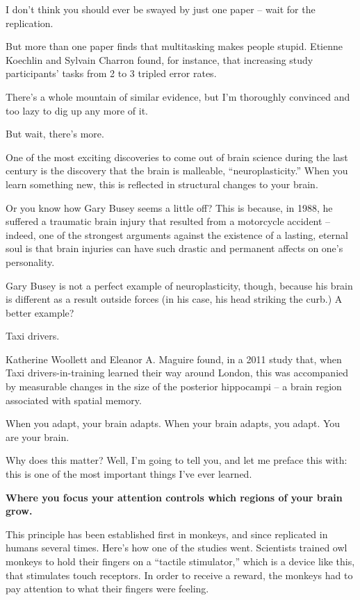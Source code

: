 I don't think you should ever be swayed by just one paper -- wait for the
replication.

But more than one paper finds that multitasking makes people stupid. Etienne
Koechlin and Sylvain Charron found, for instance, that increasing study
participants' tasks from 2 to 3 tripled error rates. \cite{charron2010divided}

There's a whole mountain of similar evidence, but I'm thoroughly convinced and
too lazy to dig up any more of it.

But wait, there's more.

One of the most exciting discoveries to come out of brain science during the
last century is the discovery that the brain is malleable, ``neuroplasticity.''
When you learn something new, this is reflected in structural changes to your
brain.

Or you know how Gary Busey seems a little off? This is because, in 1988, he
suffered a traumatic brain injury that resulted from a motorcycle accident --
indeed, one of the strongest arguments against the existence of a lasting, eternal soul
is that brain injuries can have such drastic and permanent affects on one's
personality.

Gary Busey is not a perfect example of neuroplasticity, though, because his
brain is different as a result outside forces (in his case, his head striking
the curb.) A better example?

Taxi drivers.

Katherine Woollett and Eleanor A. Maguire found, in a 2011 study that, when Taxi
drivers-in-training learned their way around London, this was accompanied by
measurable changes in the size of the posterior hippocampi -- a brain region
associated with spatial memory.

When you adapt, your brain adapts. When your brain adapts, you adapt. You are
your brain.

Why does this matter? Well, I'm going to tell you, and let me preface this with:
this is one of the most important things I've ever learned.

\textbf{Where you focus your attention controls which regions of your brain
  grow.}

This principle has been established first in monkeys, and since replicated
in humans several times.\cite{heron2010attention}\cite{stefan2004modulation} Here's how one of the studies\cite{recanzone1992topographic} went. Scientists trained owl
monkeys to hold their fingers on a ``tactile stimulator,'' which is a device like
this, that stimulates touch receptors. In order to receive a reward, the monkeys
had to pay attention to what their fingers were feeling.

